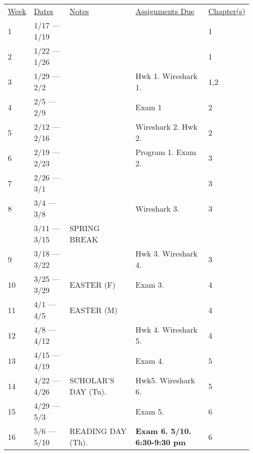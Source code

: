 \documentclass[10pt]{article}
\begin{document}
\begin{center}
  \begin{tabular}{lllll}
  \underline{Week} & \underline{Dates} & \underline{Notes} & \underline{Assignments Due} & \underline{Chapter(s)}\\
  1 & 1/17 --- 1/19 & &  & 1 \\
  2 & 1/22 --- 1/26 &  & & 1 \\
  3 & 1/29 --- 2/2 & & Hwk 1. Wireshark 1. & 1,2 \\
  4 & 2/5 --- 2/9 & & Exam 1 & 2 \\
  5 & 2/12 --- 2/16 & & Wireshark 2. Hwk 2. & 2 \\
  6 & 2/19 --- 2/23 & & Program 1. Exam 2. & 3 \\
  7 & 2/26 --- 3/1 & &  & 3 \\
  8 & 3/4 --- 3/8 & & Wireshark 3.  & 3 \\
  & 3/11 --- 3/15 &  SPRING BREAK & \\
  9 & 3/18 --- 3/22 & & Hwk 3. Wireshark 4.& 3 \\
  10 & 3/25 --- 3/29 & EASTER (F) & Exam 3.  & 4 \\
  11 & 4/1 --- 4/5 & EASTER (M) &  & 4 \\
  12 & 4/8 --- 4/12 & & Hwk 4. Wireshark 5. & 4 \\
  13 & 4/15 --- 4/19 & & Exam 4. & 5 \\
  14 & 4/22 --- 4/26 & SCHOLAR'S DAY (Tu). & Hwk5. Wireshark 6. & 5 \\
  15 & 4/29 --- 5/3 & &  Exam 5. & 6\\
  16 & 5/6 --- 5/10 & READING DAY (Th).  & \textbf{Exam 6. 5/10. 6:30-9:30 pm} & 6
  \end{tabular}
\end{center}
  
\end{document}
